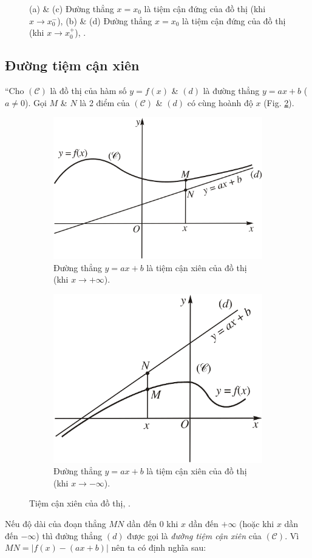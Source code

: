 \documentclass[oneside]{book}
\numberwithin{equation}{section}
\begin{document}
\begin{figure}[H]
\begin{subfigure}{.5\textwidth}
		\caption{}
	\end{subfigure}
	\caption{(a) \& (c) Đường thẳng $x = x_0$ là tiệm cận đứng của đồ thị (khi $x\to x_0^-$), (b) \& (d) Đường thẳng $x = x_0$ là tiệm cận đứng của đồ thị (khi $x\to x_0^+$), \cite[Hình 1.8, p. 30]{SGK_Toan_12_giai_tich_nang_cao}.}
	\label{fig:tiem_can_dung}
\end{figure}

\subsection{Đường tiệm cận xiên}
``Cho $(\mathcal{C})$ là đồ thị của hàm số $y = f(x)$ \& $(d)$ là đường thẳng $y = ax + b$ ($a\ne 0$). Gọi $M$ \& $N$ là 2 điểm của $(\mathcal{C})$ \& $(d)$ có cùng hoành độ $x$ (Fig. \ref{fig:tiem_can_xien}).

\begin{figure}[H]
	\centering
	\begin{subfigure}{.5\textwidth}
		\centering
		\includegraphics[width=.6\linewidth]{tiem_can_xien_a}
		\caption{Đường thẳng $y = ax + b$ là tiệm cận xiên của đồ thị (khi $x\to+\infty$).}
	\end{subfigure}%
	\begin{subfigure}{.5\textwidth}
		\centering
		\includegraphics[width=.5\linewidth]{tiem_can_xien_b}
		\caption{Đường thẳng $y = ax + b$ là tiệm cận xiên của đồ thị (khi $x\to-\infty$).}
	\end{subfigure}
	\caption{Tiệm cận xiên của đồ thị, \cite[Hình 1.11, p. 33]{SGK_Toan_12_giai_tich_nang_cao}.}
	\label{fig:tiem_can_xien}
\end{figure}
Nếu độ dài của đoạn thẳng $MN$ dần đến $0$ khi $x$ dần đến $+\infty$ (hoặc khi $x$ dần đến $-\infty$) thì đường thẳng $(d)$ được gọi là \textit{đường tiệm cận xiên} của $(\mathcal{C})$. Vì $MN = |f(x) - (ax + b)|$ nên ta có định nghĩa sau:
\end{document}
